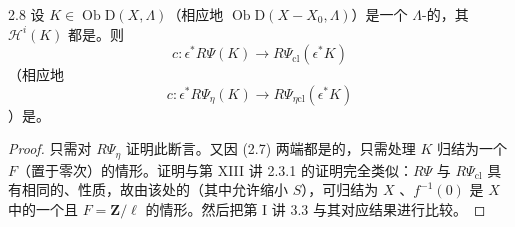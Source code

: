 \begin{SGAresult}{}{2.8}
设 $K\in\operatorname{Ob}\mathrm D(X,\Lambda)$（相应地 $\operatorname{Ob}\mathrm D(X-X_0,\Lambda)$）是一个 $\Lambda$-的，其 $\mathcal H^i(K)$ 都是。则
\[
 c:\epsilon^*R\Psi(K)\longrightarrow R\Psi_{\mathrm{cl}}(\epsilon^*K)
\]
（相应地
\[
 c:\epsilon^*R\Psi_\eta(K)\longrightarrow R\Psi_{\eta\mathrm{cl}}(\epsilon^*K)
\]
）是。
\end{SGAresult}
\begin{proof}
只需对 $R\Psi_\eta$ 证明此断言。又因 (2.7) 两端都是的，只需处理 $K$ 归结为一个 $F$（置于零次）的情形。证明与第 XIII 讲 2.3.1 的证明完全类似：$R\Psi$ 与 $R\Psi_{\mathrm{cl}}$ 具有相同的、性质，故由该处的（其中允许缩小 $S$），可归结为 $X$ 、$f^{-1}(0)$ 是 $X$ 中的一个且 $F=\mathbf Z/\ell$ 的情形。然后把第 I 讲 3.3 与其对应结果进行比较。
\end{proof}

